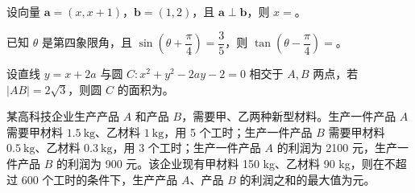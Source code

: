 \begin{question}
设向量 \(\boldsymbol{a}=(x,x+1)\)，\(\boldsymbol{b}=(1,2)\)，且 \(\boldsymbol{a}\perp\boldsymbol{b}\)，则 \(x=\)\gkblank{}。

\end{question}
\begin{question}
已知 \(\theta\) 是第四象限角，且 \(\sin\left(\theta+\dfrac{\pi}{4}\right)=\dfrac{3}{5}\)，则 \(\tan\left(\theta-\dfrac{\pi}{4}\right)=\)\gkblank{}。

\end{question}
\begin{question}
设直线 \(y=x+2a\) 与圆 \(C:x^2+y^2-2ay-2=0\) 相交于 \(A,B\) 两点，若 \(|AB|=2\sqrt{3}\)，则圆 \(C\) 的面积为\gkblank{}。

\end{question}
\begin{question}
某高科技企业生产产品 \(A\) 和产品 \(B\)，需要甲、乙两种新型材料。生产一件产品 \(A\) 需要甲材料 \(1.5\ \mathrm{kg}\)、乙材料 \(1\ \mathrm{kg}\)，用 5 个工时；生产一件产品 \(B\) 需要甲材料 \(0.5\ \mathrm{kg}\)、乙材料 \(0.3\ \mathrm{kg}\)，用 3 个工时；生产一件产品 \(A\) 的利润为 2100 元，生产一件产品 \(B\) 的利润为 900 元。该企业现有甲材料 150 kg、乙材料 90 kg，则在不超过 600 个工时的条件下，生产产品 \(A\)、产品 \(B\) 的利润之和的最大值为\gkblank{}元。

\end{question}

